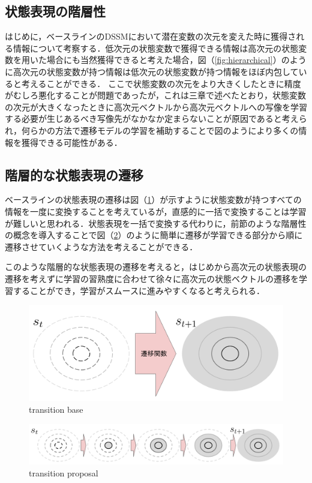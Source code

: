 \subsection{状態表現の階層性}
はじめに，ベースラインのDSSMにおいて潜在変数の次元を変えた時に獲得される情報について考察する．低次元の状態変数で獲得できる情報は高次元の状態変数を用いた場合にも当然獲得できると考えた場合，図（\ref{fig:hierarchical}）のように高次元の状態変数が持つ情報は低次元の状態変数が持つ情報をほぼ内包していると考えることができる．
ここで状態変数の次元をより大きくしたときに精度がむしろ悪化することが問題であったが，これは三章で述べたとおり，状態変数の次元が大きくなったときに高次元ベクトルから高次元ベクトルへの写像を学習する必要が生じあるべき写像先がなかなか定まらないことが原因であると考えられ，何らかの方法で遷移モデルの学習を補助することで図のようにより多くの情報を獲得できる可能性がある．

\subsection{階層的な状態表現の遷移}
ベースラインの状態表現の遷移は図（\ref{fig:transition_base}）が示すように状態変数が持つすべての情報を一度に変換することを考えているが，直感的に一括で変換することは学習が難しいと思われる．状態表現を一括で変換する代わりに，前節のような階層性の概念を導入することで図（\ref{fig:transition_proposal}）のように簡単に遷移が学習できる部分から順に遷移させていくような方法を考えることができる．

このような階層的な状態表現の遷移を考えると，はじめから高次元の状態表現の遷移を考えずに学習の習熟度に合わせて徐々に高次元の状態ベクトルの遷移を学習することができ，学習がスムースに進みやすくなると考えられる．

\begin{figure}[tbp]
  \begin{center}
    \includegraphics[width=0.5\linewidth]{./figures/transition_base.png}
    \caption{transition base}
    \label{fig:transition_base}
  \end{center}
\end{figure}

\begin{figure}[tbp]
  \begin{center}
    \includegraphics[width=0.8\linewidth]{./figures/transition_proposal.png}
    \caption{transition proposal}
    \label{fig:transition_proposal}
  \end{center}
\end{figure}

